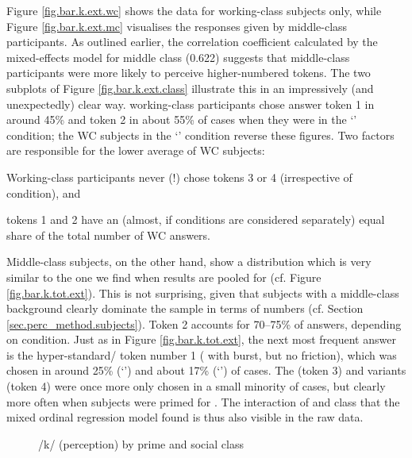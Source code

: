 Figure \ref{fig.bar.k.ext.wc} shows the data for working-class subjects only, while Figure \ref{fig.bar.k.ext.mc} visualises the responses given by middle-class participants.
As outlined earlier, the correlation coefficient calculated by the mixed-effects model for middle class (0.622) suggests that middle-class participants were more likely to perceive higher-numbered tokens.
The two subplots of Figure \ref{fig.bar.k.ext.class} illustrate this in an impressively (and unexpectedly) clear way.
working-class participants chose answer token 1 in around 45\% and token 2 in about 55\% of cases when they were in the `' condition; the WC subjects in the `' condition reverse these figures.
Two factors are responsible for the lower average of WC subjects:
\begin{inparaenum}[(a)]
	\item Working-class participants never (!) chose tokens 3 or 4 (irrespective of  condition), and
	\item tokens 1 and 2 have an (almost, if conditions are considered separately) equal share of the total number of WC answers.
\end{inparaenum} 

Middle-class subjects, on the other hand, show a distribution which is very similar to the one we find when results are pooled for  (cf. Figure \ref{fig.bar.k.tot.ext}).
This is not surprising, given that subjects with a middle-class background clearly dominate the sample in terms of numbers (cf. Section \ref{sec.perc_method.subjects}).
Token 2 accounts for 70--75\% of answers, depending on  condition.
Just as in Figure \ref{fig.bar.k.tot.ext}, the next most frequent answer is the hyper-standard/ token number 1 ( with burst, but no friction), which was chosen in around 25\% (`') and about 17\% (`') of cases.
The  (token 3) and  variants (token 4) were once more only chosen in a small minority of cases, but clearly more often when subjects were primed for .
The interaction of  and class that the mixed ordinal regression model found is thus also visible in the raw data.

\begin{figure}[h]
	\centering
		\resizebox{.49\linewidth}{!}{} 
	\caption{/k/ (perception) by prime and social class}
	\label{fig.scatter.k.ext.classprime}
\end{figure}


